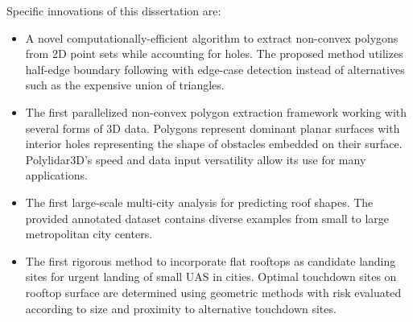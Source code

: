 Specific innovations of this dissertation are: %

\begin{itemize}[noitemsep]
      \item A novel computationally-efficient algorithm to extract non-convex polygons from 2D point sets while accounting for holes. The proposed method utilizes half-edge boundary following with edge-case detection instead of alternatives such as the expensive union of triangles.
      \item The first parallelized non-convex polygon extraction framework working with several forms of 3D data. Polygons represent dominant planar surfaces with interior holes representing the shape of obstacles embedded on their surface. Polylidar3D's speed and data input versatility allow its use for many applications.
      \item The first large-scale multi-city analysis for predicting roof shapes. The provided annotated dataset contains diverse examples from small to large metropolitan city centers. 
      \item The first rigorous method to incorporate flat rooftops as candidate landing sites for urgent landing of small UAS in cities.  Optimal touchdown sites on rooftop surface are determined using geometric methods with risk evaluated according to size and proximity to alternative touchdown sites.
\end{itemize}





